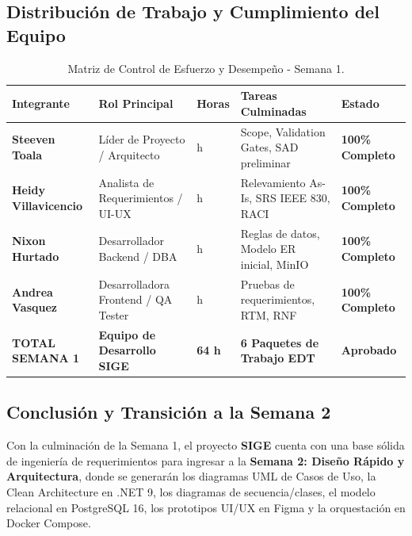 \documentclass[12pt,a4paper]{article}
\begin{document}
\subsection{Distribución de Trabajo y Cumplimiento del Equipo}

\begin{table}[htbp]
\centering
\small
\begin{tabularx}{\textwidth}{|>{\hsize=0.7\hsize\bfseries}X|>{\hsize=1.0\hsize}X|>{\hsize=0.45\hsize\centering\arraybackslash}X|>{\hsize=1.2\hsize}X|>{\hsize=0.65\hsize\centering\arraybackslash}X|}
    \hline
    \rowcolor{tableheader}
    Integrante & Rol Principal & Horas & Tareas Culminadas & Estado \\
    \hline
    Steeven Toala & Líder de Proyecto / Arquitecto & 18 h & Scope, Validation Gates, SAD preliminar & \textbf{100\% Completo} \\
    \hline
    Heidy Villavicencio & Analista de Requerimientos / UI-UX & 16 h & Relevamiento As-Is, SRS IEEE 830, RACI & \textbf{100\% Completo} \\
    \hline
    Nixon Hurtado & Desarrollador Backend / DBA & 15 h & Reglas de datos, Modelo ER inicial, MinIO & \textbf{100\% Completo} \\
    \hline
    Andrea Vasquez & Desarrolladora Frontend / QA Tester & 15 h & Pruebas de requerimientos, RTM, RNF & \textbf{100\% Completo} \\
    \hline
    \rowcolor{gray!15}
    \textbf{TOTAL SEMANA 1} & \textbf{Equipo de Desarrollo SIGE} & \textbf{64 h} & \textbf{6 Paquetes de Trabajo EDT} & \textbf{Aprobado} \\
    \hline
\end{tabularx}
\caption{Matriz de Control de Esfuerzo y Desempeño - Semana 1.}
\label{tab:s1_07_esfuerzo}
\end{table}

\subsection{Conclusión y Transición a la Semana 2}
Con la culminación de la Semana 1, el proyecto \textbf{SIGE} cuenta con una base sólida de ingeniería de requerimientos para ingresar a la \textbf{Semana 2: Diseño Rápido y Arquitectura}, donde se generarán los diagramas UML de Casos de Uso, la Clean Architecture en .NET 9, los diagramas de secuencia/clases, el modelo relacional en PostgreSQL 16, los prototipos UI/UX en Figma y la orquestación en Docker Compose.

\vspace{0.3cm}
\end{document}
